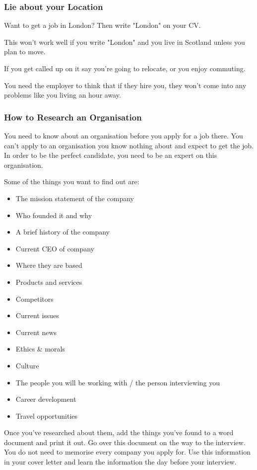 \documentclass{article}
\begin{document}
\subsubsection{Lie about your Location}
Want to get a job in London? Then write "London" on your CV.

This won't work well if you write "London" and you live in Scotland
unless you plan to move.

If you get called up on it say you're going to relocate, or you enjoy
commuting.

You need the employer to think that if they hire you, they won't come
into any problems like you living an hour away.
\subsubsection{How to Research an Organisation}
You need to know about an organisation before you apply for a job there.
You can't apply to an organisation you know nothing about and expect to
get the job. In order to be the perfect candidate, you need to be an
expert on this organisation.

Some of the things you want to find out are:

\begin{itemize}
\item
  The mission statement of the company
\item
  Who founded it and why
\item
  A brief history of the company
\item
  Current CEO of company
\item
  Where they are based
\item
  Products and services
\item
  Competitors
\item
  Current issues
\item
  Current news
\item
  Ethics \& morals
\item
  Culture
\item
  The people you will be working with / the person interviewing you
\item
  Career development
\item
  Travel opportunities
\end{itemize}

Once you've researched about them, add the things you've found to a word
document and print it out. Go over this document on the way to the
interview. You do not need to memorise every company you apply for. Use
this information in your cover letter and learn the information the day
before your interview.
\end{document}
